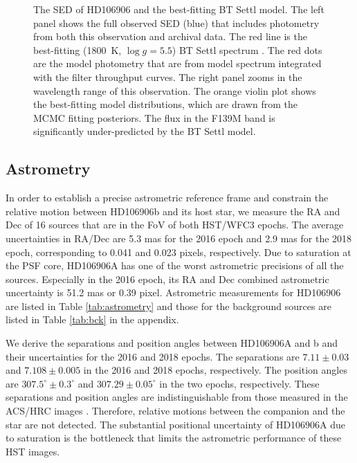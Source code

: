 \documentclass[twocolumn]{aastex62}
\begin{document}
\begin{figure}
  \centering
  \caption{The SED of HD106906 and the best-fitting BT Settl model. The left panel shows the full observed SED (blue) that includes photometry from both this observation and archival data. The red line is the best-fitting (1800~K, $\log g=5.5$) BT Settl spectrum \citep[rebinned to $R\sim100$ in a flux conserved manner, ][]{Allard2012}. The red dots are the model photometry that are from model spectrum integrated with the filter throughput curves. The right panel zooms in the wavelength range of this observation. The orange violin plot shows the best-fitting model distributions, which are drawn from the MCMC fitting posteriors. The flux in the F139M band is significantly under-predicted by the BT Settl model.}
  \label{fig:SED}
\end{figure}

\subsection{Astrometry}
\label{sec:astrometry}

In order to establish a precise astrometric reference frame and constrain the relative motion between HD106906b and its host star, we measure the RA and Dec of 16 sources that are in the FoV of both HST/WFC3 epochs. The average uncertainties in RA/Dec are 5.3 mas for the 2016 epoch and 2.9 mas for the 2018 epoch, corresponding to 0.041 and 0.023 pixels, respectively. Due to saturation at the PSF core, HD106906A has one of the worst astrometric precisions of all the sources. Especially in the 2016 epoch, its RA and Dec combined astrometric uncertainty is 51.2 mas or 0.39 pixel. Astrometric measurements for HD106906 are listed in Table \ref{tab:astrometry} and those for the background sources are listed in Table \ref{tab:bck} in the appendix.

We derive the separations and position angles between HD106906A and b and their uncertainties for the 2016 and 2018 epochs. The separations are $7.11\pm0.03$ and $7.108\pm0.005$ in the 2016 and 2018 epochs, respectively. The position angles are $307.5^{\circ}\pm0.3^{\circ}$ and $307.29\pm0.05^{{\circ}}$ in the two epochs, respectively. These separations and position angles are indistinguishable from those measured in the ACS/HRC images \citep{Bailey2013}. Therefore, relative motions between the companion and the star are not detected. The substantial positional uncertainty of HD106906A due to saturation is the bottleneck that limits the astrometric performance of these HST images.
\end{document}
